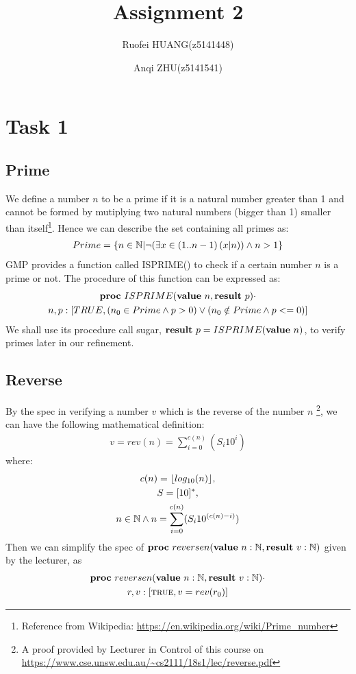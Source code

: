 \documentclass[a4paper,12pt,fleqn]{scrartcl}
\title{Assignment 2}
\author{Ruofei HUANG(z5141448)\and
Anqi ZHU(z5141541)
}
\begin{document}
\maketitle
\section{Task 1}
\subsection{Prime }
We define a number $n$ to be a prime if it is a natural number greater than 1 and 
cannot be formed by mutiplying two natural numbers (bigger than 1) smaller than 
itself\footnote{
Reference from Wikipedia:
\url{https://en.wikipedia.org/wiki/Prime_number}}.
Hence we can describe the set containing all primes as:
\begin{gather*}
  Prime = \{ n\in \mathbb{N} | \neg (\exists x\in (1..n-1)\left(x|n\right)) \wedge n > 1 \}
\end{gather*} 
GMP provides a function called ISPRIME() to check if a certain number $n$ is a 
prime or not. The procedure of this function can be expressed as:
\begin{gather*}
  \text{\normalfont\bfseries proc} \ ISPRIME(\text{\normalfont\bfseries value} \ n, \text{\normalfont\bfseries result} \ p) \cdot \\
  n, p: [TRUE, (n_0 \in Prime \wedge p > 0) \vee (n_0 \notin Prime \wedge p<=0)]
\end{gather*}
We shall use its procedure call sugar, $\text{\normalfont\bfseries result} \ p = ISPRIME(\text{\normalfont\bfseries value} \ n)$, to 
verify primes later in our refinement.

\subsection{Reverse}
By the spec in verifying a number $v$ which is the reverse of the number $n$
\footnote{A proof provided by Lecturer in Control of this course on 
\url{https://www.cse.unsw.edu.au/~cs2111/18s1/lec/reverse.pdf} },
we can have the following mathematical definition:
\begin{gather*}
  v = rev(n) = \sum_{i= 0}^{c(n)}(S_i 10^i)
\end{gather*}
where:
\begin{gather*}
  c(n) = \lfloor log_{10}(n)\rfloor ,\\
  S = [10]^* ,\\
  n \in \mathbb{N} \wedge n = \sum_{i=0}^{c(n)}(S_i 10 ^{(c(n)-i)})
\end{gather*}
Then we can simplify the spec of 
$\text{\normalfont\bfseries proc} \ reversen(\text{\normalfont\bfseries value} \ n: \mathbb{N}, \text{\normalfont\bfseries result} \ v: \mathbb{N} )$ 
given by the lecturer, as 
\begin{gather*}
  \text{\normalfont\bfseries proc} \ reversen(\text{\normalfont\bfseries value} \ n: \mathbb{N}, \text{\normalfont\bfseries result} \ v: \mathbb{N} ) \cdot \\
  r, v:[\text{\textsc{true}}, v = rev(r_0)]
\end{gather*}
\end{document}
